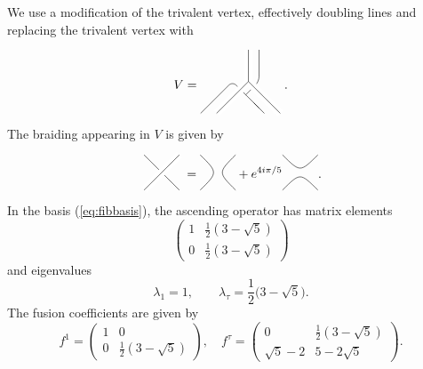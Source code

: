 \documentclass[11pt,oneside]{amsart}
\theoremstyle{plain}%
\theoremstyle{definition}
\theoremstyle{remark}
\begin{document}
We use a modification of the trivalent vertex, effectively doubling lines and replacing the trivalent vertex with
\begin{equation}
	V=\begin{tikzpicture}[scale=0.6,baseline=10mm]
    \draw[rounded corners] (2.5, 3.5) -- (2.5, 2) -- (1.875, 1.375);
    \draw (2.25, 1) -- (2.75, 0.5);
    \draw[rounded corners] (2.5, 0.75) -- (1.25, 2) -- (-0.25, 0.5);
    \draw[draw=white,double=black,double distance=0.4pt,line width=3pt] (2, 3.5) -- (2, 2) -- (0.5, 0.5);
		\draw (2, 2) -- (2.2, 1.8);
    \draw[draw=white,double=black,double distance=0.4pt,line width=3pt] (2.1, 1.9) -- (3.5, 0.5);
  \end{tikzpicture}.
\end{equation}
The braiding appearing in $V$ is given by
\begin{equation}
	\begin{tikzpicture}[scale=0.5,baseline=3.5mm]
    \draw (0, 2) -- (2, 0);
    \draw[draw=white,double=black,double distance=0.4pt,line width=3pt] (0, 0) -- (2, 2);
  \end{tikzpicture}
	=
	\begin{tikzpicture}[scale=0.5,baseline=3.5mm]
    \draw (0, 0) .. controls (1, 1) .. (0, 2);
    \draw (2, 0) .. controls (1, 1) .. (2, 2);
  \end{tikzpicture}
	+e^{4i\pi/5}
  \begin{tikzpicture}[scale=0.5,baseline=3.5mm]
    \draw (0, 0) .. controls (1, 1) .. (2, 0);
    \draw (0, 2) .. controls (1, 1) .. (2, 2);
  \end{tikzpicture}.
\end{equation}
In the basis (\ref{eq:fibbasis}), the ascending operator has matrix elements
\begin{equation}
	\begin{pmatrix}
		1 & \frac{1}{2}(3-\sqrt{5})\\
		0 & \frac{1}{2}(3-\sqrt{5})
	\end{pmatrix}
\end{equation}
and eigenvalues
\begin{equation}
	\lambda_1=1, \qquad \lambda_\tau=\frac{1}{2}\bigl(3-\sqrt{5}\bigr).
\end{equation}
The fusion coefficients are given by
\begin{equation}
	f^1=\begin{pmatrix}
		1 & 0\\
		0 & \frac{1}{2}(3-\sqrt{5})
	\end{pmatrix},\quad
	f^\tau=\begin{pmatrix}
		0 & \frac{1}{2}(3-\sqrt{5})\\
		\sqrt{5}-2 & 5-2\sqrt{5}
	\end{pmatrix}.
\end{equation}
\end{document}
